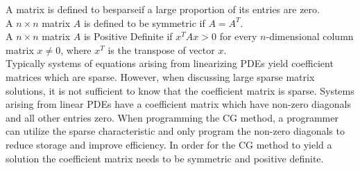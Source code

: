 A matrix is defined to besparseif a large proportion of its entries are zero.
\\
A $n \times n$ matrix $A$ is defined to be symmetric if $A=A^T$.
\\
A $n \times n$ matrix $A$ is Positive Definite if $x^{T}Ax>0$ for every $n$-dimensional column matrix $x \neq 0$, where $x^T$ is the transpose of vector $x$.
\\
Typically systems of equations arising from linearizing PDEs yield coefficient matrices which are sparse. However, when discussing large sparse matrix solutions, it is not sufficient to know that the coefficient  matrix is sparse.  Systems arising from linear PDEs have a coefficient matrix which have non-zero diagonals and all other entries zero. When programming the CG method, a programmer can utilize the sparse characteristic and only program the non-zero diagonals to reduce storage and improve efficiency. In order for the CG method to yield a solution the coefficient matrix needs to be symmetric and positive definite.
